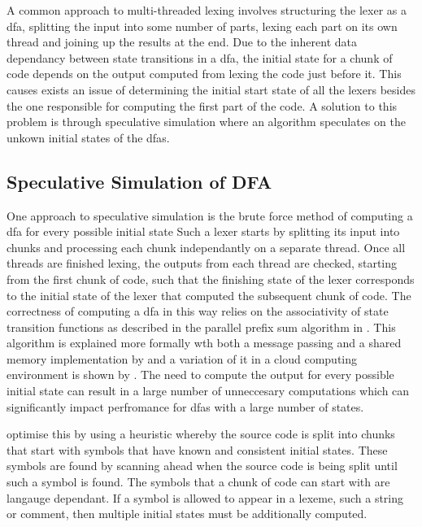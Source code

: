 A common approach to multi-threaded lexing involves structuring the lexer as
a \gls{dfa}, splitting the input into some number of parts, lexing each part on
its own thread and joining up the results at the end. Due to the inherent data
dependancy between state transitions in a \gls{dfa}, the initial state for a
chunk of code depends on the output computed from lexing the code just before
it. This causes exists an issue of determining the initial start state of all
the lexers besides the one responsible for computing the first part of the code.
A solution to this problem is through speculative simulation where an algorithm
speculates on the unkown initial states of the \gls{dfa}s.

\subsection{Speculative Simulation of DFA}

One approach to speculative simulation is the brute force method of computing
a \gls{dfa} for every possible initial state  Such a lexer starts by splitting
its input into chunks and processing each chunk independantly on a separate
thread. Once all threads are finished lexing, the outputs from each thread are
checked, starting from the first chunk of code, such that the finishing state
of the lexer corresponds to the initial state of the lexer that computed the
subsequent chunk of code. The correctness of computing a \gls{dfa} in this
way relies on the  associativity of state transition functions as described in
the parallel prefix sum algorithm in \cite{hillis_data_1986}. This algorithm
is explained more formally wth both a message passing and a shared memory
implementation by \cite{holub_parallel_2009} and a variation of it in a cloud
computing environment is shown by \cite{ko_speculative_2012}. The need to
compute the output for every possible initial state can result in a large number
of unneccesary computations which can significantly impact perfromance for
\gls{dfa}s with a large number of states.

\cite{barenghi_parallel_2015} optimise this by using a heuristic whereby the
source code is split into chunks that start with symbols that have known and
consistent initial states. These symbols are found by scanning ahead when
the source code is being split until such a symbol is found. The symbols
that a chunk of code can start with are langauge dependant. If a symbol is
allowed to appear in a lexeme, such a string or comment, then multiple initial
states must be additionally computed. 

